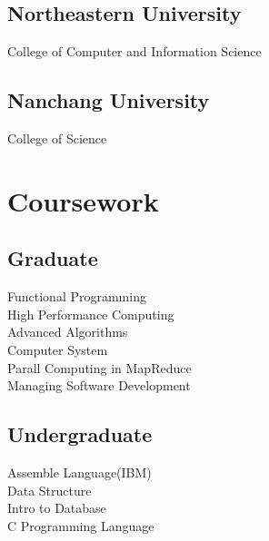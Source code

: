 \documentclass[letterpaper]{lyu-resume} %
\begin{document}
\begin{minipage}[t]{0.33\textwidth}
\subsection{Northeastern University}

College of Computer and Information Science

\sectionspace %


\subsection{Nanchang University}

College of Science

\sectionspace %


\section{Coursework}

\subsection{Graduate}

Functional Programming \\
High Performance Computing\\
Advanced Algorithms \\
Computer System \\
Parall Computing in MapReduce \\
Managing Software Development

\sectionspace %


\subsection{Undergraduate}

Assemble Language(IBM) \\
Data Structure \\
Intro to Database \\
C Programming Language

\sectionspace %


\end{minipage} %
\end{document}
